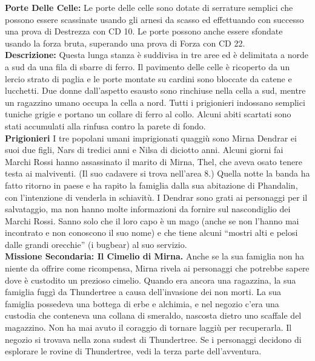 \documentclass{article}
\begin{document}
        \textbf{Porte Delle Celle: } Le porte delle celle sono dotate di
        serrature semplici che possono essere scassinate usando gli
        arnesi da scasso ed effettuando con successo una prova di
        Destrezza con CD 10. Le porte possono anche essere sfondate
        usando la forza bruta, superando una prova di Forza con CD 22.\\

        \textbf{Descrizione: }Questa lunga stanza è suddivisa in tre aree ed è delimitata
        a norde a sud da una fila di sbarre di ferro. Il pavimento
        delle celle è ricoperto da un lercio strato di paglia e le porte
        montate su cardini sono bloccate da catene e lucchetti. Due
        donne dall’aspetto esausto sono rinchiuse nella cella a sud,
        mentre un ragazzino umano occupa la cella a nord. Tutti i
        prigionieri indossano semplici tuniche grigie e portano un
        collare di ferro al collo.
        Alcuni abiti scartati sono stati accumulati alla rinfusa contro la
        parete di fondo.\\

        \textbf{Prigionieri} I tre popolani umani imprigionati quaggiù sono Mirna Dendrar
        ei suoi due figli, Nars di tredici anni e Nilsa di diciotto anni.
        Alcuni giorni fai Marchi Rossi hanno assassinato il marito di
        Mirna, Thel, che aveva osato tenere testa ai malviventi. (Il suo
        cadavere si trova nell’area 8.) Quella notte la banda ha fatto
        ritorno in paese e ha rapito la famiglia dalla sua abitazione di
        Phandalin, con l'intenzione di venderla in schiavitù.
        I Dendrar sono grati ai personaggi per il salvataggio, ma
        non hanno molte informazioni da fornire sul nascondiglio dei
        Marchi Rossi. Sanno solo che il loro capo è un mago (anche
        se non l'hanno mai incontrato e non conoscono il suo nome) e
        che tiene alcuni “mostri alti e pelosi dalle grandi orecchie” (i
        bugbear) al suo servizio. \\

        \textbf{Missione Secondaria: Il Cimelio di Mirna.} Anche se la
        sua famiglia non ha niente da offrire come ricompensa, Mirna
        rivela ai personaggi che potrebbe sapere dove è custodito
        un prezioso cimelio. Quando era ancora una ragazzina, la
        sua famiglia fuggì da Thundertree a causa dell'invasione dei
        non morti. La sua famiglia possedeva una bottega di erbe
        e alchimia, e nel negozio c'era una custodia che conteneva
        una collana di smeraldo, nascosta dietro uno scaffale del
        magazzino. Non ha mai avuto il coraggio di tornare laggiù
        per recuperarla. Il negozio si trovava nella zona sudest di
        Thundertree. Se i personaggi decidono di esplorare le rovine
        di Thundertree, vedi la terza parte dell’avventura.
 
\end{document}
